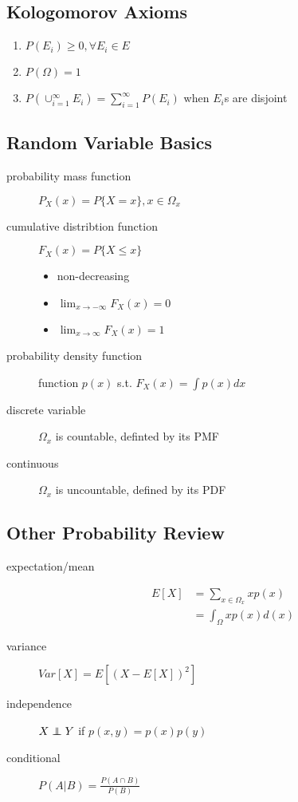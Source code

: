 \documentclass[]{article}
\theoremstyle{definition}
\newcommand\independent{\protect\mathpalette{\protect\independenT}{\perp}}
\def\independenT#1#2{\mathrel{\rlap{$#1#2$}\mkern2mu{#1#2}}}
\newcommand{\1}[1]{\mathds{1}_#1}
\begin{document}
	\subsection{Kologomorov Axioms}
	\label{sub:kologomorov_axioms}

	\begin{enumerate}
		\item $P(E_i) \geq 0, \forall E_i \in E$
		\item $P(\Omega) = 1$
		\item $P(\cup_{i=1}^{\infty} E_i) = \sum_{i=1}^\infty P(E_i)$ when $E_i$s are disjoint
	\end{enumerate}

	\subsection{Random Variable Basics}
	\label{sub:random_variable_basics}

	\begin{description}
		\item[probability mass function] $P_X(x) = P \{X = x\}, x \in \Omega_x$
		\item[cumulative distribtion function] $F_X(x) = P \{ X \leq x \}$
			\begin{itemize}
				\item non-decreasing
				\item $ \lim_{x \to - \infty} F_X(x) = 0$
				\item $ \lim_{x \to \infty} F_X(x) = 1$
			\end{itemize}
		\item[probability density function] function $p(x)$  s.t. $F_X(x) = \int p(x)dx$
		\item[discrete variable] $\Omega_x$ is countable, definted by its PMF
		\item[continuous] $\Omega_x$ is uncountable, defined by its PDF
	\end{description}

	\subsection{Other Probability Review}
	\label{sub:other_probability_review}
	\begin{description}
		\item[expectation/mean] \begin{align*}
				E[X] &= \sum_{x \in \Omega_x} x p(x) \\
				 	 &= \int_{\Omega} x p(x) d(x)
			\end{align*}
		\item[variance] $Var[X] = E[(X - E[X])^2]$
		\item[independence] $X \independent Y$ if $p(x,y) = p(x)p(y)$
		\item[conditional] $P(A|B) = \frac{P(A \cap B)}{P(B)}$
	\end{description}
	
\end{document}
